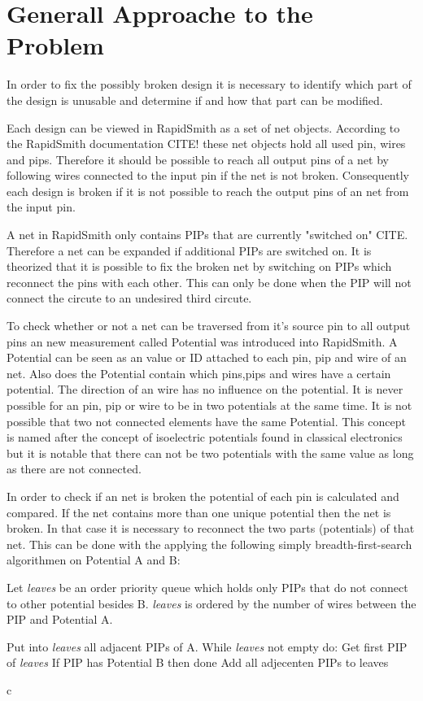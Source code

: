 \chapter{Generall Approache to the Problem}
\label{cha:approachestotheproblem}

In order to fix the possibly broken design it is necessary to identify which part of the design is unusable and determine if and how that part can be modified.

Each design can be viewed in RapidSmith as a set of net objects. According to the RapidSmith documentation CITE! these net objects hold all used pin, wires and pips.
Therefore it should be possible to reach all output pins of a net by following wires connected to the input pin if the net is not broken.
Consequently each design is broken if it is not possible to reach the output pins of an net from the input pin.  

A net in RapidSmith only contains PIPs that are currently "switched on" CITE. Therefore a net can be expanded if additional PIPs are switched on. 
It is theorized that it is possible to fix the broken net by switching on PIPs which reconnect the pins with each other. This can only be done when the PIP will not connect the circute to an undesired third circute.

To check whether or not a net can be traversed from it's source pin to all output pins an new measurement called Potential was introduced into RapidSmith.
A Potential can be seen as an value or ID attached to each pin, pip and wire of an net. Also does the Potential contain which pins,pips and wires have a certain potential. The direction of an wire has no influence on the potential.
It is never possible for an pin, pip or wire to be in two potentials at the same time. It is not possible that two not connected elements have the same Potential. 
This concept is named after the concept of isoelectric potentials found in classical electronics but it is notable that there can not be two potentials with the same value as long as there are not connected.

In order to check if an net is broken the potential of each pin is calculated and compared. If the net contains more than one unique potential then the net is broken.
In that case it is necessary to reconnect the two parts (potentials) of that net. This can be done with the applying the following simply breadth-first-search algorithmen on Potential A and B:

Let \textit{leaves} be an order priority queue which holds only PIPs that do not connect to other potential besides B. \textit{leaves} is ordered by the number of wires between the PIP and Potential A.

Put into \textit{leaves} all adjacent PIPs of A.
While \textit{leaves} not empty do:
	Get first PIP of \textit{leaves}
	If PIP has Potential B then done
	Add all adjecenten PIPs to leaves

c